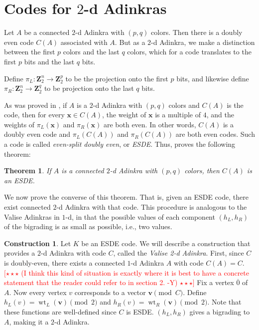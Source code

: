 \documentclass[12pt,twoside,singlespace]{article}
\numberwithin{equation}{section}
\newtheorem{thm}[equation]{Theorem}
\theoremstyle{definition}
\newtheorem{construction}[equation]{Construction}
\newcommand{\ZZ}{\mathbf{Z}}
\newcommand{\on}{\operatorname}
\newcommand{\wt}{\on{wt}}
\newcommand{\com}[1]{\textcolor{red}{$[\star \star \star$ #1 $\star \star \star]$}}
\renewcommand{\vec}[1]{\mathbf{#1}}
\begin{document}
\section{Codes for $2$-d Adinkras}
\label{sec:code2d}
Let $A$ be a connected $2$-d Adinkra with $(p,q)$ colors.  Then there is a doubly even code $C(A)$ associated with $A$.  But as a $2$-d Adinkra, we make a distinction between the first $p$ colors and the last $q$ colors, which for a code translates to the first $p$ bits and the last $q$ bits.

Define $\pi_L:\ZZ_2^n\to\ZZ_2^p$ to be the projection onto the first $p$ bits, and likewise define $\pi_R:\ZZ_2^n\to\ZZ_2^q$ to be projection onto the last $q$ bits.

As was proved in \cite{hubsch:weaving}, if $A$ is a $2$-d Adinkra with $(p,q)$ colors and $C(A)$ is the code, then for every $\vec{x}\in C(A)$, the weight of $\vec{x}$ is a multiple of $4$, and the weights of $\pi_L(\vec{x})$ and $\pi_R(\vec{x})$ are both even.  In other words, $C(A)$ is a doubly even code and $\pi_L(C(A))$ and $\pi_R(C(A))$ are both even codes.  Such a code is called \emph{even-split doubly even}, or \emph{ESDE}.  Thus, \cite{hubsch:weaving} proves the following theorem:
\begin{thm}
\label{thm:esde}
If $A$ is a connected $2$-d Adinkra with $(p,q)$ colors, then $C(A)$ is an ESDE.
\end{thm}

We now prove the converse of this theorem.  That is, given an ESDE code, there exist connected $2$-d Adinkra with that code.  This procedure is analogous to the Valise Adinkras in $1$-d,\cite{d2l:first,d2l:graph-theoretic} in that the possible values of each component $(h_L,h_R)$ of the bigrading is as small as possible, i.e., two values.

\begin{construction}
\label{cons:valise}
Let $K$ be an ESDE code.  We will describe a construction that provides a $2$-d Adinkra with code $C$, called the {\em Valise 2-d Adinkra}. First, since $C$ is doubly-even, there exists a connected $1$-d Adinkra $A$ with code $C(A) = C$. \cite{d2l:omni,d2l:topology} \com{(I think this kind of situation is exactly where it is best to have a concrete statement that the reader could refer to in section 2. -Y)} Fix a vertex $\overline{0}$ of $A$. Now every vertex $v$ corresponds to a vector $\vec{v} \pmod{C}$. Define $h_L(v) = \wt_L(\vec{v}) \pmod{2}$ and $h_R(v) = \wt_R(\vec{v}) \pmod{2}$. Note that these functions are well-defined since $C$ is ESDE. $(h_L, h_R)$ gives a bigrading to $A$, making it a $2$-d Adinkra.
\end{construction}
\end{document}
